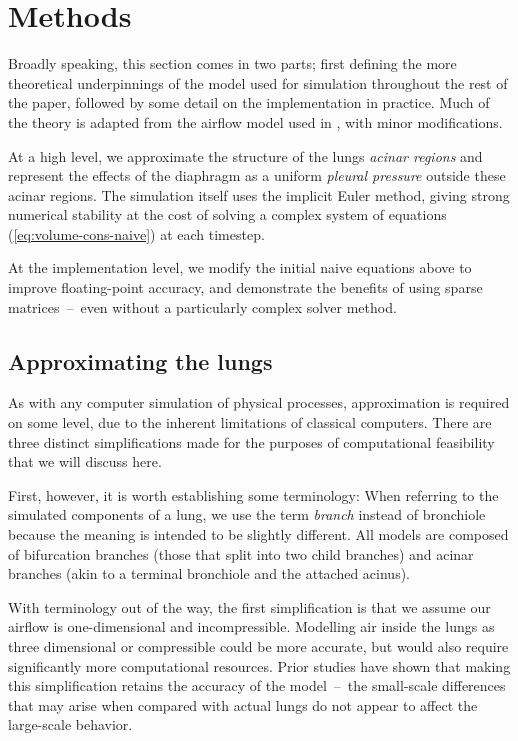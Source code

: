 %
\section{Methods}

Broadly speaking, this section comes in two parts; first defining the more theoretical underpinnings
of the model used for simulation throughout the rest of the paper, followed by some detail on the
implementation in practice. Much of the theory is adapted from the airflow model used in
\cite{FoyEtAl2017}, with minor modifications.

At a high level, we approximate the structure of the lungs \textit{acinar regions} and represent the
effects of the diaphragm as a uniform \textit{pleural pressure} outside these acinar regions. The
simulation itself uses the implicit Euler method, giving strong numerical stability at the cost of
solving a complex system of equations (\autoref{eq:volume-cons-naive}) at each timestep.

At the implementation level, we modify the initial naive equations above to improve floating-point
accuracy, and demonstrate the benefits of using sparse matrices~--~even without a particularly
complex solver method.

\subsection{Approximating the lungs} \label{sec:approximating-lungs}

As with any computer simulation of physical processes, approximation is required on some level, due
to the inherent limitations of classical computers. There are three distinct simplifications made
for the purposes of computational feasibility that we will discuss here.

First, however, it is worth establishing some terminology: When referring to the simulated
components of a lung, we use the term \textit{branch} instead of bronchiole because the meaning is
intended to be slightly different. All models are composed of bifurcation branches (those that split
into two child branches) and acinar branches (akin to a terminal bronchiole and the attached
acinus).

\breakpars

With terminology out of the way, the first simplification is that we assume our airflow is
one-dimensional and incompressible. Modelling air inside the lungs as three dimensional or
compressible could be more accurate, but would also require significantly more computational
resources. Prior studies have shown that making this simplification retains the accuracy of the
model~--~the small-scale differences that may arise when compared with actual lungs do not appear to
affect the large-scale behavior.

